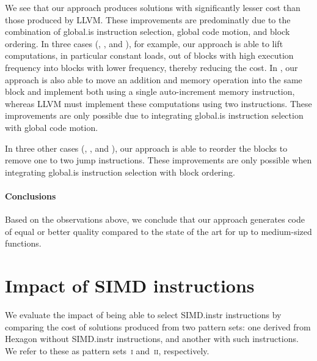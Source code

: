 We see that our approach produces \glspl{solution} with significantly lesser
cost than those produced by \gls{LLVM}.
%
These improvements are predominatly due to the combination of \gls{global.is}
\gls{instruction selection}, \gls{global code motion}, and \gls{block ordering}.
%
In three cases (, ,
and ), for example, our approach is able to lift
computations, in particular constant loads, out of \glspl{block} with high
execution frequency into \glspl{block} with lower frequency, thereby reducing
the cost.
%
In , our approach is also able to move an addition
and memory operation into the same \gls{block} and implement both using a single
auto-increment memory \gls{instruction}, whereas \gls{LLVM} must implement these
computations using two \glspl{instruction}.
%
These improvements are only possible due to integrating \gls{global.is}
\gls{instruction selection} with \gls{global code motion}.

In three other cases (,
, and ), our approach
is able to reorder the \glspl{block} to remove one to two jump
\glspl{instruction}.
%
These improvements are only possible when integrating \gls{global.is}
\gls{instruction selection} with \gls{block ordering}.


\paragraph{Conclusions}

Based on the observations above, we conclude that our approach generates code of
equal or better quality compared to the state of the art for up to medium-sized
\glspl{function}.



\section{Impact of SIMD instructions}

\def\patternSetA{\textsc{i}}
\def\patternSetB{\textsc{ii}}

We evaluate the impact of being able to select \gls{SIMD.instr}
\glspl{instruction} by comparing the cost of \glspl{solution} produced from two
\glspl{pattern set}: one derived from \gls{Hexagon} without \gls{SIMD.instr}
\glspl{instruction}, and another with such \glspl{instruction}.
%
We refer to these as \glspl{pattern set}~\patternSetA{} and~\patternSetB,
respectively.


